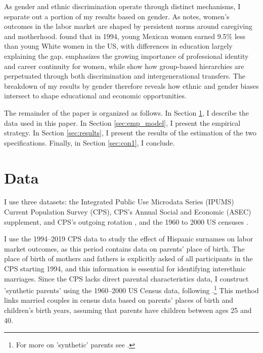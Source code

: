 As gender and ethnic discrimination operate through distinct mechanisms, I separate out a portion of my results based on gender. As \textcite{bertrand2020gender} notes, women's outcomes in the labor market are shaped by persistent norms around caregiving and motherhood. \textcite{antecol2002relative} found that in 1994, young Mexican women earned 9.5\% less than young White women in the US, with differences in education largely explaining the gap. \textcite{goldin2004making} emphasizes the growing importance of professional identity and career continuity for women, while \textcite{darity2015tour} show how group-based hierarchies are perpetuated through both discrimination and intergenerational transfers. The breakdown of my results by gender therefore reveals how ethnic and gender biases intersect to shape educational and economic opportunities.

The remainder of the paper is organized as follows. In Section \ref{sec:data}, I describe the data used in this paper. In Section \ref{sec:emp_model}, I present the empirical strategy. In Section \ref{sec:results}, I present the results of the estimation of the two specifications. Finally, in Section \ref{sec:con1}, I conclude.


\section{Data}\label{sec:data}

I use three datasets: the Integrated Public Use Microdata Series (IPUMS) Current Population Survey (CPS), CPS's Annual Social and Economic (ASEC) supplement, and CPS's outgoing rotation \autocite{cps2019}, and the 1960 to 2000 US censuses \autocite{acs2019}.


I use the 1994–2019 CPS data to study the effect of Hispanic surnames on labor market outcomes, as this period contains data on parents' place of birth. The place of birth of mothers and fathers is explicitly asked of all participants in the CPS starting 1994, and this information is essential for identifying interethnic marriages. Since the CPS lacks direct parental characteristics data, I construct 'synthetic parents' using the 1960–2000 US Census data, following \textcite{rubinstein2014pride}.\footnote{For more on 'synthetic' parents see \textcite{aaronson2008intergenerational}.} This method links married couples in census data based on parents' places of birth and children's birth years, assuming that parents have children between ages 25 and 40.

